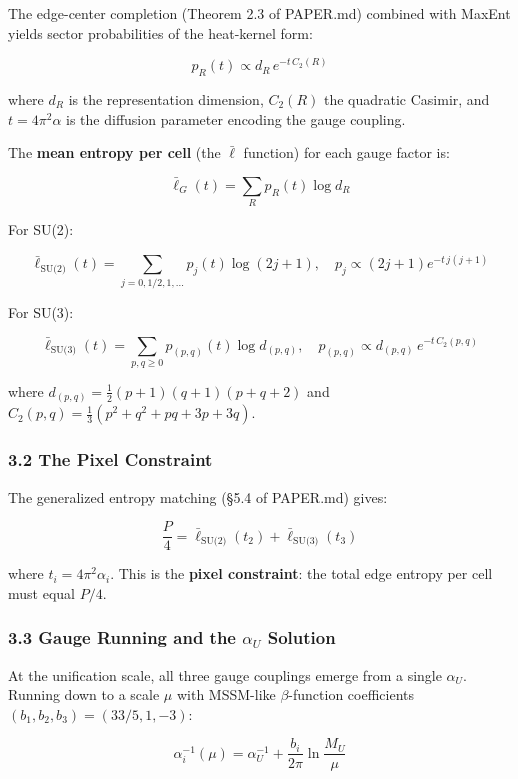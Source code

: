 The edge-center completion (Theorem 2.3 of PAPER.md) combined with MaxEnt yields sector probabilities of the heat-kernel form:

\[p_R(t) \propto d_R \, e^{-t \, C_2(R)}\]

where \(d_R\) is the representation dimension, \(C_2(R)\) the quadratic Casimir, and \(t = 4\pi^2 \alpha\) is the diffusion parameter encoding the gauge coupling.

The \textbf{mean entropy per cell} (the \(\bar{\ell}\) function) for each gauge factor is:

\[\bar{\ell}_G(t) = \sum_R p_R(t) \log d_R\]

For SU(2):

\[\bar{\ell}_{\text{SU(2)}}(t) = \sum_{j=0,1/2,1,...} p_j(t) \log(2j+1), \quad p_j \propto (2j+1) e^{-t \, j(j+1)}\]

For SU(3):

\[\bar{\ell}_{\text{SU(3)}}(t) = \sum_{p,q \geq 0} p_{(p,q)}(t) \log d_{(p,q)}, \quad p_{(p,q)} \propto d_{(p,q)} \, e^{-t \, C_2(p,q)}\]

where \(d_{(p,q)} = \frac{1}{2}(p+1)(q+1)(p+q+2)\) and \(C_2(p,q) = \frac{1}{3}(p^2 + q^2 + pq + 3p + 3q)\).

\subsubsection{3.2 The Pixel Constraint}\label{32-the-pixel-constraint}

The generalized entropy matching (§5.4 of PAPER.md) gives:

\[\frac{P}{4} = \bar{\ell}_{\text{SU(2)}}(t_2) + \bar{\ell}_{\text{SU(3)}}(t_3)\]

where \(t_i = 4\pi^2 \alpha_i\). This is the \textbf{pixel constraint}: the total edge entropy per cell must equal \(P/4\).

\subsubsection{\texorpdfstring{3.3 Gauge Running and the \(\alpha_U\) Solution}{3.3 Gauge Running and the \textbackslash alpha\_U Solution}}\label{33-gauge-running-and-the-alpha_u-solution}

At the unification scale, all three gauge couplings emerge from a single \(\alpha_U\). Running down to a scale \(\mu\) with MSSM-like \(\beta\)-function coefficients \((b_1, b_2, b_3) = (33/5, 1, -3)\):

\[\alpha_i^{-1}(\mu) = \alpha_U^{-1} + \frac{b_i}{2\pi} \ln\frac{M_U}{\mu}\]

